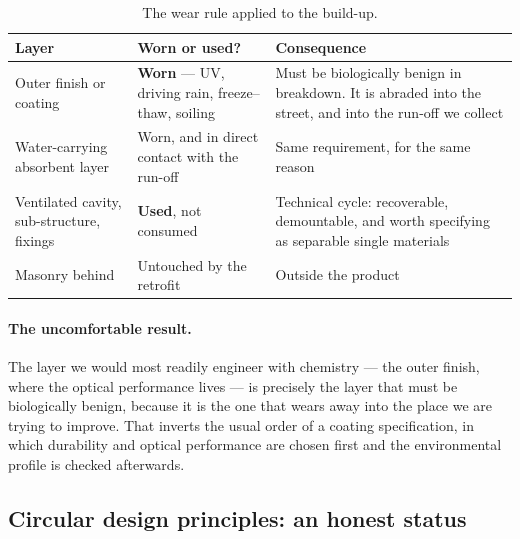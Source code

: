 \begin{table}[htbp]
\centering
\caption{The wear rule applied to the build-up.}
\label{tab:cycles}
\renewcommand{\arraystretch}{1.25}
\small
\begin{tabularx}{\textwidth}{L{4.2cm} L{3.4cm} X}
\toprule
\textbf{Layer} & \textbf{Worn or used?} & \textbf{Consequence} \\
\midrule
Outer finish or coating & \textbf{Worn} --- UV, driving rain, freeze--thaw, soiling
& Must be biologically benign in breakdown. It is abraded into the street, and
into the run-off we collect \\
Water-carrying absorbent layer & Worn, and in direct contact with the run-off
& Same requirement, for the same reason \\
Ventilated cavity, sub-structure, fixings & \textbf{Used}, not consumed
& Technical cycle: recoverable, demountable, and worth specifying as separable
single materials \\
Masonry behind & Untouched by the retrofit & Outside the product \\
\bottomrule
\end{tabularx}
\end{table}

\paragraph{The uncomfortable result.} The layer we would most readily engineer
with chemistry --- the outer finish, where the optical performance lives --- is
precisely the layer that must be biologically benign, because it is the one that
wears away into the place we are trying to improve. That inverts the usual
order of a coating specification, in which durability and optical performance
are chosen first and the environmental profile is checked afterwards.

\subsection{Circular design principles: an honest status}

